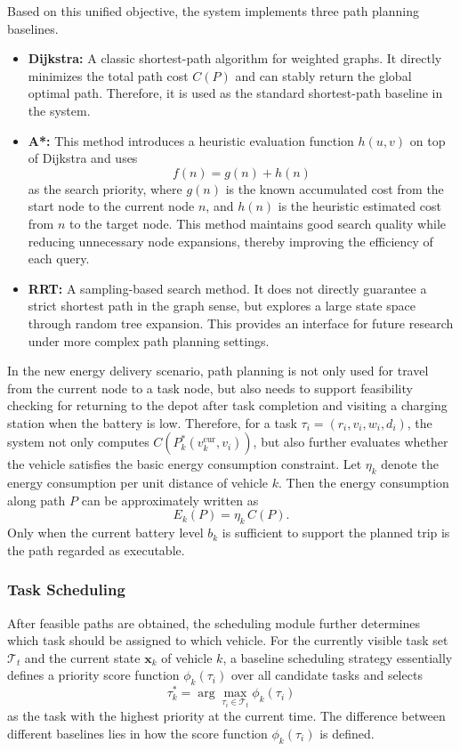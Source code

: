Based on this unified objective, the system implements three path planning baselines.
\begin{itemize}
  \item \textbf{Dijkstra:} A classic shortest-path algorithm for weighted graphs. It directly minimizes the total path cost \(C(P)\) and can stably return the global optimal path. Therefore, it is used as the standard shortest-path baseline in the system.
  \item \textbf{A*:} This method introduces a heuristic evaluation function \(h(u,v)\) on top of Dijkstra and uses
  \[
  f(n)=g(n)+h(n)
  \]
  as the search priority, where \(g(n)\) is the known accumulated cost from the start node to the current node \(n\), and \(h(n)\) is the heuristic estimated cost from \(n\) to the target node. This method maintains good search quality while reducing unnecessary node expansions, thereby improving the efficiency of each query.
  \item \textbf{RRT:} A sampling-based search method. It does not directly guarantee a strict shortest path in the graph sense, but explores a large state space through random tree expansion. This provides an interface for future research under more complex path planning settings.
\end{itemize}
In the new energy delivery scenario, path planning is not only used for travel from the current node to a task node, but also needs to support feasibility checking for returning to the depot after task completion and visiting a charging station when the battery is low. Therefore, for a task \(\tau_i=(r_i, v_i, w_i, d_i)\), the system not only computes \(C(P_k^*(v_k^{\text{cur}}, v_i))\), but also further evaluates whether the vehicle satisfies the basic energy consumption constraint. Let \(\eta_k\) denote the energy consumption per unit distance of vehicle \(k\). Then the energy consumption along path \(P\) can be approximately written as
\[
E_k(P)=\eta_k\, C(P).
\]
Only when the current battery level \(b_k\) is sufficient to support the planned trip is the path regarded as executable.

\subsubsection{Task Scheduling}
After feasible paths are obtained, the scheduling module further determines which task should be assigned to which vehicle. For the currently visible task set \(\mathcal{T}_t\) and the current state \(\mathbf{x}_k\) of vehicle \(k\), a baseline scheduling strategy essentially defines a priority score function \(\phi_k(\tau_i)\) over all candidate tasks and selects
\[
\tau_k^*=\arg\max_{\tau_i\in \mathcal{T}_t} \phi_k(\tau_i)
\]
as the task with the highest priority at the current time. The difference between different baselines lies in how the score function \(\phi_k(\tau_i)\) is defined.

